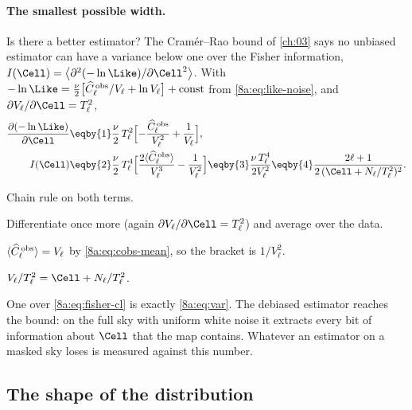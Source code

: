 \paragraph{The smallest possible width.}
Is there a better estimator? The Cram\'er--Rao bound of \cref{ch:03} says no unbiased
estimator can have a variance below one over the Fisher information,
$I(\Cell)=\bigl\langle\partial^2(-\ln\Like)/\partial\Cell^2\bigr\rangle$. With
$-\ln\Like=\frac\nu2\bigl[\widehat C^{\,\rm obs}_\ell/V_\ell+\ln V_\ell\bigr]+\text{const}$ from
\eqref{8a:eq:like-noise}, and $\partial V_\ell/\partial\Cell=T_\ell^2$,
\begin{align}
  \frac{\partial(-\ln\Like)}{\partial\Cell}
  &\eqby{1}\frac{\nu}{2}\,T_\ell^2\Bigl[-\frac{\widehat C^{\,\rm obs}_\ell}{V_\ell^2}+\frac{1}{V_\ell}\Bigr],
  \nonumber\\
  I(\Cell)
  &\eqby{2}\frac{\nu}{2}\,T_\ell^4\Bigl[\frac{2\langle\widehat C^{\,\rm obs}_\ell\rangle}{V_\ell^3}-\frac{1}{V_\ell^2}\Bigr]
   \eqby{3}\frac{\nu\,T_\ell^4}{2V_\ell^2}
   \eqby{4}\frac{2\ell+1}{2\,(\Cell+N_\ell/T_\ell^2)^2} .
  \label{8a:eq:fisher-cl}
\end{align}
\begin{explain}
  \item Chain rule on both terms.
  \item Differentiate once more (again $\partial V_\ell/\partial\Cell=T_\ell^2$) and average over the data.
  \item $\langle\widehat C^{\,\rm obs}_\ell\rangle=V_\ell$ by \eqref{8a:eq:cobs-mean}, so the bracket is $1/V_\ell^2$.
  \item $V_\ell/T_\ell^2=\Cell+N_\ell/T_\ell^2$.
\end{explain}
One over \eqref{8a:eq:fisher-cl} is exactly \eqref{8a:eq:var}. The debiased estimator reaches
the bound: on the full sky with uniform white noise it extracts every bit of information
about $\Cell$ that the map contains. Whatever an estimator on a masked sky loses is measured
against this number.

\subsection{The shape of the distribution}
\label{8a:sec:shape}

